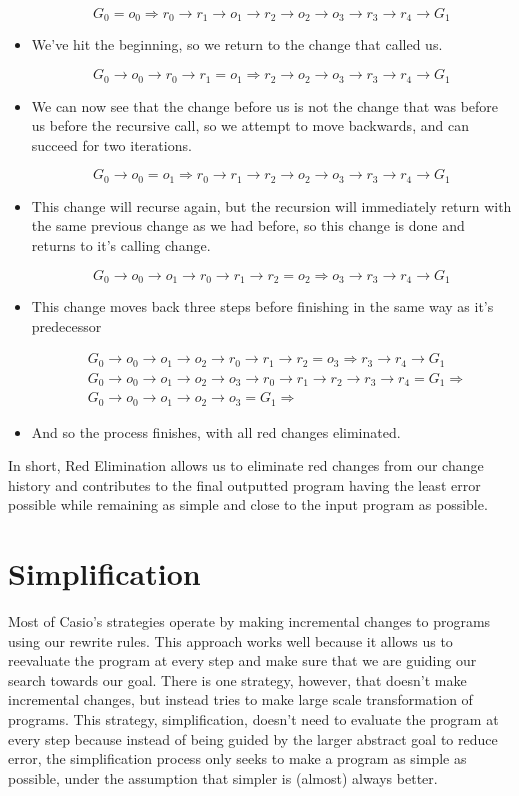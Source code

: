 \documentclass{article}
\newcommand{\insetarrow}[1]{=#1\Rightarrow}
\begin{document}
\begin{itemize}
\[G_0\insetarrow{o_0}r_0\to r_1 
\to o_1\to r_2 \to o_2 \to o_3 
\to r_3\to r_4 \to G_1\]

\item We've hit the beginning, 
so we return to the change that called us.

\[G_0\to o_0\to r_0\to r_1 
\insetarrow{o_1} r_2 \to o_2 \to o_3 
\to r_3\to r_4 \to G_1\]

\item We can now see that the change before us 
is not the change that was before us 
before the recursive call, 
so we attempt to move backwards, 
and can succeed for two iterations.

\[G_0\to o_0\insetarrow{o_1} r_0
\to r_1 \to r_2 \to o_2 \to o_3 
\to r_3\to r_4 \to G_1\]

\item This change will recurse again, 
but the recursion will immediately return 
with the same previous change 
as we had before, 
so this change is done 
and returns to it's calling change.

\[G_0\to o_0\to o_1\to r_0
\to r_1 \to r_2 \insetarrow{o_2} o_3 
\to r_3\to r_4 \to G_1\]

\item This change moves back three steps 
before finishing in the same way as it's predecessor

\begin{align*}
&G_0\to o_0\to o_1\to o_2
\to r_0\to r_1 \to r_2 \insetarrow{o_3} 
r_3\to r_4 \to G_1\\
&G_0\to o_0\to o_1\to o_2
\to o_3 \to r_0 \to r_1\to r_2
\to r_3 \to r_4 \insetarrow{G_1}\\
&G_0\to o_0\to o_1\to o_2
\to o_3 \insetarrow{G_1}
\end{align*}

\item And so the process finishes, 
with all red changes eliminated.
\end{itemize}

In short, 
Red Elimination allows us to eliminate
red changes from our change history 
and contributes to the final outputted 
program having the least error possible 
while remaining as simple 
and close to the input program 
as possible.

\section{Simplification}

Most of Casio's strategies 
operate by making incremental changes 
to programs using our rewrite rules. 
This approach works well 
because it allows us to reevaluate the program 
at every step 
and make sure that we are guiding our search 
towards our goal. 
There is one strategy, however, 
that doesn't make incremental changes, 
but instead tries to make 
large scale transformation of programs. 
This strategy, simplification, 
doesn't need to evaluate 
the program at every step 
because instead of being guided 
by the larger abstract goal 
to reduce error, 
the simplification process only seeks 
to make a program as simple as possible, 
under the assumption that 
simpler is (almost) always better.
\end{document}
